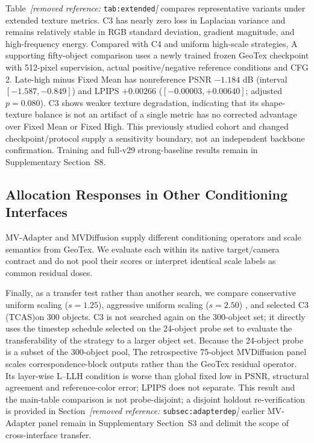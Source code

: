 \documentclass[times,twocolumn,final]{elsarticle}
\providecommand{\DIFadd}[1]{{\protect\color{blue} \sf #1}} %
\providecommand{\DIFdel}[1]{{\protect\color{red} \scriptsize #1}} %
\providecommand{\DIFaddbegin}{} %
\providecommand{\DIFaddend}{} %
\providecommand{\DIFdelbegin}{} %
\providecommand{\DIFdelend}{} %
\begin{document}
\DIFdelbegin \DIFdel{Table~\textit{[removed reference: }\texttt{tab:extended}\textit{]} compares representative variants under extended texture metrics. C3 has nearly zero loss in Laplacian variance and remains relatively stable in RGB standard deviation, gradient magnitude, and high-frequency energy. Compared with C4 and uniform high-scale strategies, }\DIFdelend \DIFaddbegin \DIFadd{A supporting fifty-object comparison uses a newly trained frozen GeoTex checkpoint with 512-pixel supervision, actual positive/negative reference conditions and CFG 2. Late-high minus Fixed Mean has nonreference PSNR $-1.184$ dB (interval $[-1.587,-0.849]$) and LPIPS $+0.00266$ ($[-0.00003,+0.00640]$; adjusted $p=0.080$). }\DIFaddend C3 \DIFdelbegin \DIFdel{shows weaker texture degradation, indicating that its shape-texture balance is not an artifact of a single metric}\DIFdelend \DIFaddbegin \DIFadd{has no corrected advantage over Fixed Mean or Fixed High. This previously studied cohort and changed checkpoint/protocol supply a sensitivity boundary, not an independent backbone confirmation. Training and full-v29 strong-baseline results remain in Supplementary Section~S8}\DIFaddend .

\DIFdelbegin %

\DIFdelend \DIFaddbegin \subsection{Allocation Responses in Other Conditioning Interfaces}
\label{subsec:cross-interface}
\DIFadd{MV-Adapter and MVDiffusion supply different conditioning operators and scale semantics from GeoTex. We evaluate each within its native target/camera contract and do not pool their scores or interpret identical scale labels as common residual doses.
}\DIFaddend 

\DIFdelbegin \DIFdel{Finally, as a transfer test rather than another search, we compare conservative uniform scaling ($s = 1.25$), aggressive uniform scaling ($s = 2.50$) , and selected C3 (TCAS)on 300 objects. C3 is not searched again on the 300-object set; it directly uses the timestep schedule selected on the 24-object probe set to evaluate the transferability of the strategy to a larger object set. Because the 24-object probe is a subset of the 300-object pool, }\DIFdelend \DIFaddbegin \DIFadd{The retrospective 75-object MVDiffusion panel scales correspondence-block outputs rather than the GeoTex residual operator. Its layer-wise L--LLH condition is worse than global fixed low in PSNR, structural agreement and reference-color error; LPIPS does not separate. This result and }\DIFaddend the \DIFdelbegin \DIFdel{main-table comparison is not probe-disjoint; a disjoint holdout re-verification is provided in Section~\textit{[removed reference: }\texttt{subsec:adapterdep}\textit{]}}\DIFdelend \DIFaddbegin \DIFadd{earlier MV-Adapter panel remain in Supplementary Section~S3 and delimit the scope of cross-interface transfer}\DIFaddend .
\end{document}
